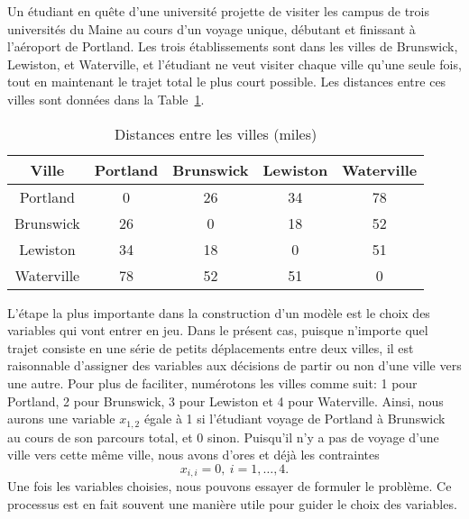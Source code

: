 \begin{example}
\label{sec:ex_villes}

Un étudiant en quête d'une université projette de visiter les campus de trois universités du Maine au cours d'un voyage unique, débutant et finissant à l'aéroport de Portland.
Les trois établissements sont dans les villes de Brunswick, Lewiston, et Waterville, et l'étudiant ne veut visiter chaque ville qu'une seule fois, tout en maintenant le trajet total le plus court possible.
Les distances entre ces villes sont données dans la Table~\ref{tab:distances}.

\begin{table}[htbp]
\begin{center}
\begin{tabular}{|c|c|c|c|c|}
\hline
Ville & Portland & Brunswick & Lewiston & Waterville \\
\hline
Portland & 0 & 26 & 34 & 78 \\
\hline
Brunswick & 26 & 0 & 18 & 52 \\
\hline
Lewiston & 34 & 18 & 0 & 51 \\
\hline
Waterville & 78 & 52 & 51 & 0 \\
\hline
\end{tabular}
\caption{Distances entre les villes (miles)}
\label{tab:distances}
\end{center}
\end{table}

L'étape la plus importante dans la construction d'un modèle est le choix des variables qui vont entrer en jeu.
Dans le présent cas, puisque n'importe quel trajet consiste en une série de petits déplacements entre deux villes, il est raisonnable d'assigner des variables aux décisions de partir ou non d'une ville vers une autre.
Pour plus de faciliter, numérotons les villes comme suit: 1 pour Portland, 2 pour Brunswick, 3 pour Lewiston et 4 pour Waterville. 
Ainsi, nous aurons une variable $x_{1,2}$ égale à 1 si l'étudiant voyage de Portland à Brunswick au cours de son parcours total, et 0 sinon.
Puisqu'il n'y a pas de voyage d'une ville vers cette même ville, nous avons d'ores et déjà les contraintes
\begin{equation}
x_{i,i} = 0,\ i = 1,\ldots,4.
\label{eq:dist_const_1}
\end{equation}
Une fois les variables choisies, nous pouvons essayer de formuler le problème.
Ce processus est en fait souvent une manière utile pour guider le choix des variables.


\end{example}
